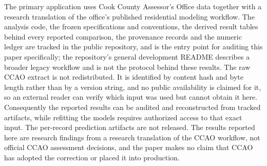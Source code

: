 \documentclass[10pt]{article}
\theoremstyle{definition}
\newcommand{\1}{\mathbf{1}}
\begin{document}
The primary application uses Cook County Assessor's Office data together with a research
translation of the office's published residential modeling workflow. The analysis code, the frozen
specifications and conventions, the derived result tables behind every reported comparison, the
provenance records and the numeric ledger are tracked in the public repository, and
 is the entry point for auditing this paper specifically; the
repository's general development README describes a broader legacy workflow and is not the protocol
behind these results. The raw CCAO extract is not redistributed. It is identified by content hash
and byte length rather than by a version string, and no public availability is claimed for it, so an
external reader can verify which input was used but cannot obtain it here. Consequently the reported
results can be audited and reconstructed from tracked artifacts, while refitting the models requires
authorized access to that exact input. The per-record prediction artifacts are not released. The
results reported here are research findings from a research translation of the CCAO workflow, not
official CCAO assessment decisions, and the paper makes no claim that CCAO has adopted the
correction or placed it into production.
\end{document}
